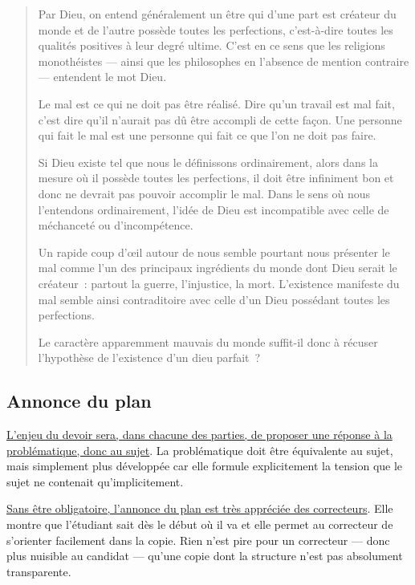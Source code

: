 \documentclass[a4paper,12pt]{article}
\begin{document}
\begin{quotation}
Par Dieu, on entend généralement un être qui
d'une part est créateur du monde et de l'autre possède toutes les
perfections, c'est-à-dire toutes les qualités positives à leur degré
ultime. C'est en ce sens que les religions monothéistes — ainsi que
les philosophes en l'absence de mention contraire — entendent le mot
Dieu.

Le mal est ce qui ne doit pas être réalisé. Dire qu'un travail est mal
fait, c'est dire qu'il n'aurait pas dû être accompli de cette façon.
Une personne qui fait le mal est une personne qui fait ce que l'on ne
doit pas faire. 

Si Dieu existe tel que nous le définissons
ordinairement, alors dans la mesure où il possède toutes les
perfections, il doit être infiniment bon et donc ne devrait pas
pouvoir accomplir le mal. Dans le sens où nous l'entendons
ordinairement, l'idée de Dieu est incompatible avec celle de
méchanceté ou d'incompétence.

Un rapide coup d'œil autour de nous semble
pourtant nous présenter le mal comme l'un des principaux ingrédients
du monde dont Dieu serait le créateur : partout la guerre,
l'injustice, la mort. L'existence manifeste du mal semble ainsi
contraditoire avec celle d'un Dieu possédant toutes les perfections.

Le caractère apparemment mauvais du monde
suffit-il donc à récuser l'hypothèse de l'existence d'un dieu
parfait ?
\end{quotation}



\subsection{Annonce du plan}
\label{sec-2-4}
\label{annonce}

\uline{L'enjeu du devoir sera, dans chacune des parties, de proposer une
réponse à la problématique, donc au sujet}. La problématique doit être
équivalente au sujet, mais simplement plus développée car elle formule
explicitement la tension que le sujet ne contenait qu'implicitement.


\uline{Sans être obligatoire, l'annonce du plan est très appréciée des
correcteurs}. Elle montre que l'étudiant sait dès le début où il va et
elle permet au correcteur de s'orienter facilement dans la copie. Rien
n'est pire pour un correcteur — donc plus nuisible au candidat — qu'une
copie dont la structure n'est pas absolument transparente.
\end{document}
